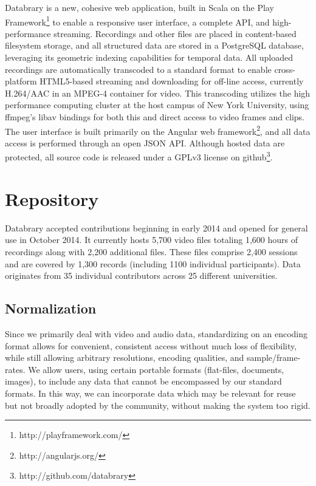 \documentclass{sig-alternate}
\begin{document}
Databrary is a new, cohesive web application, built in Scala on the Play Framework\footnote{http://playframework.com/} to enable a responsive user interface, a complete API, and high-performance streaming.
Recordings and other files are placed in content-based filesystem storage, and all structured data are stored in a PostgreSQL database, leveraging its geometric indexing capabilities for temporal data.
All uploaded recordings are automatically transcoded to a standard format to enable cross-platform HTML5-based streaming and downloading for off-line access, currently H.264/AAC in an MPEG-4 container for video.
This transcoding utilizes the high performance computing cluster at the host campus of New York University, using ffmpeg's libav bindings for both this and direct access to video frames and clips.
The user interface is built primarily on the Angular web framework\footnote{http://angularjs.org/}, and all data access is performed through an open JSON API.
Although hosted data are protected, all source code is released under a GPLv3 license on github\footnote{http://github.com/databrary}.

\section{Repository}

Databrary accepted contributions beginning in early 2014 and opened for general use in October 2014.
It currently hosts 5,700 video files totaling 1,600 hours of recordings along with 2,200 additional files.
These files comprise 2,400 sessions and are covered by 1,300 records (including 1100 individual participants).
Data originates from 35 individual contributors across 25 different universities.

\subsection{Normalization}


Since we primarily deal with video and audio data, standardizing on an encoding format allows for convenient, consistent access without much loss of flexibility, while still allowing arbitrary resolutions, encoding qualities, and sample/frame-rates.
We allow users, using certain portable formats (flat-files, documents, images), to include any data that cannot be encompassed by our standard formats.
In this way, we can incorporate data which may be relevant for reuse but not broadly adopted by the community, without making the system too rigid.
\end{document}
